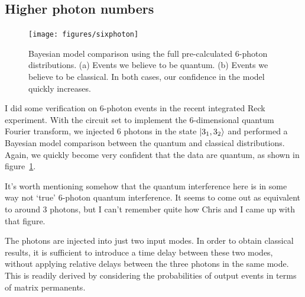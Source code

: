 \subsection{Higher photon numbers}
\label{sec:SixPhoton}
\begin{figure}
  \centering
  \texttt{[image: figures/sixphoton]}
  \caption[Bayesian model comparison on 6-photon events]
  {Bayesian model comparison using the full pre-calculated 6-photon
  distributions. (a) Events we believe to be quantum. (b) Events we believe to
  be classical. In both cases, our confidence in the model quickly increases.}
  \label{fig:sixphoton}
\end{figure}
I did some verification on 6-photon events in the recent integrated Reck
experiment. With the circuit set to implement the 6-dimensional quantum Fourier
transform, we injected 6 photons in the state \(\left|3_{1},3_{2}\right\rangle\) and
performed a Bayesian model comparison between the quantum and classical
distributions. Again, we quickly become very confident that the data are
quantum, as shown in figure~\ref{fig:sixphoton}.

It's worth mentioning somehow that the quantum interference here is in some way
not `true' 6-photon quantum interference. It seems to come out as equivalent to
around 3 photons, but I can't remember quite how Chris and I came up with that
figure.

The photons are injected into just two input modes. In order to obtain classical
results, it is sufficient to introduce a time delay between these two modes,
without applying relative delays between the three photons in the same mode.
This is readily derived by considering the probabilities of output events in
terms of matrix permanents.
